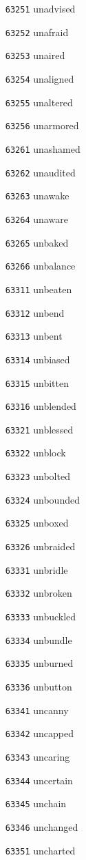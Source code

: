 \documentclass[twoside,11pt]{article}
\begin{document}
\begin{multicols}{5}
\begin{enumerate}
\item[\texttt{63251}] unadvised
\item[\texttt{63252}] unafraid
\item[\texttt{63253}] unaired
\item[\texttt{63254}] unaligned
\item[\texttt{63255}] unaltered
\item[\texttt{63256}] unarmored
\item[\texttt{63261}] unashamed
\item[\texttt{63262}] unaudited
\item[\texttt{63263}] unawake
\item[\texttt{63264}] unaware
\item[\texttt{63265}] unbaked
\item[\texttt{63266}] unbalance
\item[\texttt{63311}] unbeaten
\item[\texttt{63312}] unbend
\item[\texttt{63313}] unbent
\item[\texttt{63314}] unbiased
\item[\texttt{63315}] unbitten
\item[\texttt{63316}] unblended
\item[\texttt{63321}] unblessed
\item[\texttt{63322}] unblock
\item[\texttt{63323}] unbolted
\item[\texttt{63324}] unbounded
\item[\texttt{63325}] unboxed
\item[\texttt{63326}] unbraided
\item[\texttt{63331}] unbridle
\item[\texttt{63332}] unbroken
\item[\texttt{63333}] unbuckled
\item[\texttt{63334}] unbundle
\item[\texttt{63335}] unburned
\item[\texttt{63336}] unbutton
\item[\texttt{63341}] uncanny
\item[\texttt{63342}] uncapped
\item[\texttt{63343}] uncaring
\item[\texttt{63344}] uncertain
\item[\texttt{63345}] unchain
\item[\texttt{63346}] unchanged
\item[\texttt{63351}] uncharted

\end{enumerate}
\end{multicols}
\end{document}
